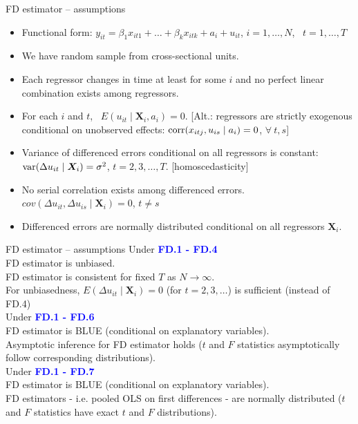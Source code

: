 \documentclass[usenames,dvipsnames]{beamer}
\begin{document}
\begin{frame}{FD estimator – assumptions}
\begin{itemize}
\item[\textbf{FD.1}] Functional form: $y_{it} = \beta_1 x_{it1} + \dots + \beta_k x_{itk} + a_i + u_{it}$, $i = 1, \dots, N$, \ $t = 1, \dots, T$
\item[\textbf{FD.2}] We have random sample from cross-sectional units.
\item[\textbf{FD.3}] Each regressor changes in time at least for some $i$ and no perfect linear combination exists among regressors.
\item[\textbf{FD.4}] For each $i$ and $t$, \ $E (u_{it} \mid \bm{X}_i, a_i) = 0$. [Alt.: regressors are strictly exogenous conditional on unobserved effects: $\textnormal{corr}(x_{itj}, u_{is} \mid a_i)=0$, \quad $\forall \ t, s$]
\item[\textbf{FD.5}] Variance of differenced errors conditional on all regressors is constant: $\textnormal{var}(\Delta u_{it} \mid \bm{X}_i) = \sigma^2$, \quad $t= 2,3, \dots, T$. [homoscedasticity]
\item[\textbf{FD.6}] No serial correlation exists among differenced errors. $\textit{cov}(\Delta u_{it}, \Delta u_{is} \mid \bm{X}_i) = 0$, \quad $t \neq s$
\item[\textbf{FD.7}] Differenced errors are normally distributed conditional on all regressors $\bm{X}_i$.
\end{itemize}
\end{frame}
\begin{frame}{FD estimator – assumptions}
Under  \textcolor{blue}{\textbf{FD.1 - FD.4}}\\
FD estimator is unbiased. \\
FD estimator is consistent for fixed $T$ as $N \rightarrow \infty$.\\
For unbiasedness, $E (\Delta u_{it} \mid \bm{X}_i) = 0$ (for $t = 2,3, \dots$) is sufficient (instead of FD.4)\\
\medskip
Under \textcolor{blue}{\textbf{FD.1 - FD.6}}\\
FD estimator is BLUE (conditional on explanatory variables).\\
Asymptotic inference for FD estimator holds ($t$ and $F$ statistics asymptotically follow corresponding distributions).\\
\medskip
Under  \textcolor{blue}{\textbf{FD.1 - FD.7}}\\
FD estimator is BLUE (conditional on explanatory variables).\\
FD estimators - i.e. pooled OLS on first differences - are normally distributed ($t$ and $F$ statistics have exact $t$ and $F$ distributions).
\end{frame}
\end{document}

